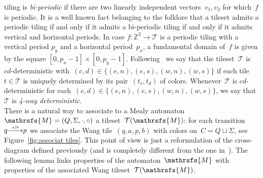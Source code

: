 \documentclass{amsart}
\begin{document}
tiling is \emph{bi-periodic} if there are two linearly independent
vectors~$v_{1}, v_{2}$ for which~$f$ is periodic. It is a well known
fact belonging to the folklore that a tileset admits a periodic tiling
if and only if it admits a bi-periodic tiling if and only if it admits
vertical and horizontal periods. In case  $f:\mathbb{Z}^{2}\rightarrow
\mathcal{T}$ is a periodic tiling with a vertical period $p_{y}$ and a horizontal period~$p_{x}$, a fundamental domain of~$f$ is given by the square $[0,p_{x}-1]\times [0,p_{y}-1]$. Following~\cite{LeGlo14} we say that the tileset~$\mathcal{T}$ is $cd$-deterministic
with~$(c,d)\in\{(e,n),(e,s),(w,n),(w,s)\}$ if each tile~$t\in\mathcal{T}$ is uniquely determined by its pair~$(t_{c},t_{d})$ of colors. Whenever~$\mathcal{T}$ is $cd$-deterministic for each~$(c,d)\in\{(e,n),(e,s),(w,n),(w,s)\}$, we say that $\mathcal{T}$ is \emph{4-way deterministic}.
\\
There is a natural way to associate to a Mealy automaton~${{{\mathrsfs{{M}}}}}=({{{Q}}},{{{\Sigma}}},{{{\cdot}}},{{{\circ}}})$ a tileset~$\mathcal{T}({{{\mathrsfs{{M}}}}})$: for each transition~$q{\smash{\stackrel{\text{\tiny{${a|b}$}}}{\relbar\joinrel\longrightarrow}}}p$ we associate the Wang tile~$(q, a, p, b)$ with colors on~$C={{{Q}}}\sqcup {{{\Sigma}}}$, see Figure~\ref{fig:associat tiles}. This point of view is just a reformulation of the cross-diagram defined previously (and is completely different from the one in~\cite{Gillibert14}).
The following lemma links properties of the automaton~${{{\mathrsfs{{M}}}}}$ with properties of the associated Wang tileset~$\mathcal{T}({{{\mathrsfs{{M}}}}})$.
\end{document}
